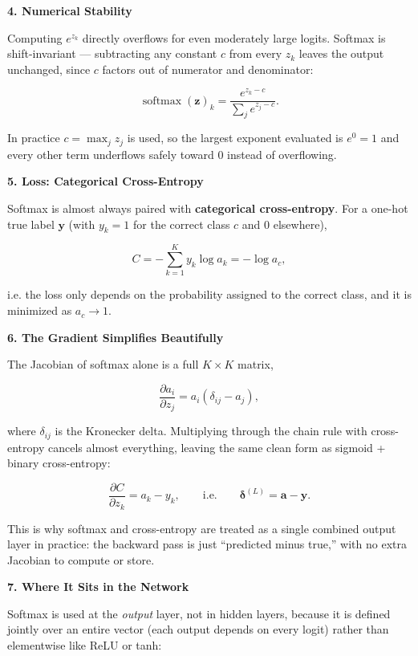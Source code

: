 \documentclass[conference]{IEEEtran}
\begin{document}
\bigskip

\textbf{4. Numerical Stability}

Computing $e^{z_k}$ directly overflows for even moderately large logits.
Softmax is shift-invariant --- subtracting any constant $c$ from every
$z_k$ leaves the output unchanged, since $c$ factors out of numerator and
denominator:

\[
  \operatorname{softmax}(\mathbf{z})_k
  = \frac{e^{z_k-c}}{\sum_{j} e^{z_j-c}}.
\]

In practice $c = \max_j z_j$ is used, so the largest exponent evaluated is
$e^0=1$ and every other term underflows safely toward $0$ instead of
overflowing.

\bigskip

\textbf{5. Loss: Categorical Cross-Entropy}

Softmax is almost always paired with \textbf{categorical cross-entropy}.
For a one-hot true label $\mathbf{y}$ (with $y_k=1$ for the correct class
$c$ and $0$ elsewhere),

\[
  C = -\sum_{k=1}^{K} y_k \log a_k = -\log a_c,
\]

i.e. the loss only depends on the probability assigned to the correct
class, and it is minimized as $a_c \to 1$.

\bigskip

\textbf{6. The Gradient Simplifies Beautifully}

The Jacobian of softmax alone is a full $K\times K$ matrix,

\[
  \frac{\partial a_i}{\partial z_j} = a_i(\delta_{ij} - a_j),
\]

where $\delta_{ij}$ is the Kronecker delta. Multiplying through the chain
rule with cross-entropy cancels almost everything, leaving the same clean
form as sigmoid + binary cross-entropy:

\[
  \frac{\partial C}{\partial z_k} = a_k - y_k,
  \qquad\text{i.e.}\qquad
  \boldsymbol{\delta}^{(L)} = \mathbf{a} - \mathbf{y}.
\]

This is why softmax and cross-entropy are treated as a single combined
output layer in practice: the backward pass is just ``predicted minus
true,'' with no extra Jacobian to compute or store.

\bigskip

\textbf{7. Where It Sits in the Network}

Softmax is used at the \emph{output} layer, not in hidden layers, because
it is defined jointly over an entire vector (each output depends on every
logit) rather than elementwise like ReLU or tanh:
\end{document}
